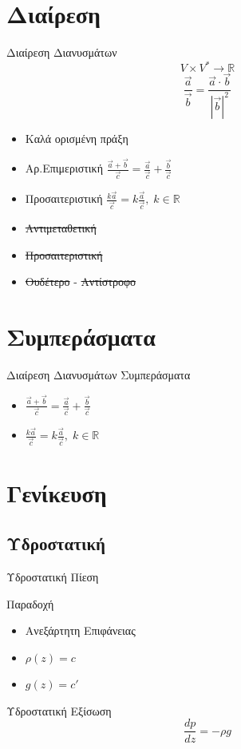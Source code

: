 \documentclass[greek]{beamer}
\begin{document}
\section{Διαίρεση}
\begin{frame}{Διαίρεση Διανυσμάτων}
  $$V \times V^* \to \mathbb{R}$$
  $$\frac{\vec{a}}{\vec{b}}=\frac{\vec{a}\cdot\vec{b}}{\left|\vec{b}\right|^2}$$
  \begin{itemize}
    \item<2-> Καλά ορισμένη πράξη
    \item<3-> Αρ.Επιμεριστική $\frac{\vec{a}+\vec{b}}{\vec{c}}=\frac{\vec{a}}{\vec{c}}+\frac{\vec{b}}{\vec{c}}$
    \item<4-> Προσαιτεριστική $\frac{k\vec{a}}{\vec{c}}=k\frac{\vec{a}}{\vec{c}},\; k\in\mathbb{R}$
    \item<5-> \sout{Αντιμεταθετική}
    \item<6-> \sout{Προσαιτεριστική}
    \item<7-> \sout{Ουδέτερο} - \sout{Αντίστροφο}
  \end{itemize}
\end{frame}

\section{Συμπεράσματα}
\begin{frame}{Διαίρεση Διανυσμάτων Συμπεράσματα}
  \begin{itemize}
    \item<1-> $\displaystyle\frac{\vec{a}+\vec{b}}{\vec{c}}=\frac{\vec{a}}{\vec{c}}+\frac{\vec{b}}{\vec{c}}$
    \item<3->$\displaystyle\frac{k\vec{a}}{\vec{c}}=k\frac{\vec{a}}{\vec{c}},\; k\in\mathbb{R}$
  \end{itemize}
\end{frame}

\section{Γενίκευση}
\subsection{Υδροστατική}
\begin{frame}{Υδροστατική Πίεση}
  \begin{block}{Παραδοχή}
    \begin{itemize}
      \item Ανεξάρτητη Επιφάνειας
      \item $ρ(z)=c$
      \item $g(z)=c'$
    \end{itemize}
  \end{block}
  Υδροστατική Εξίσωση $$\frac{dp}{dz}=-ρg$$
\end{frame}
\end{document}
